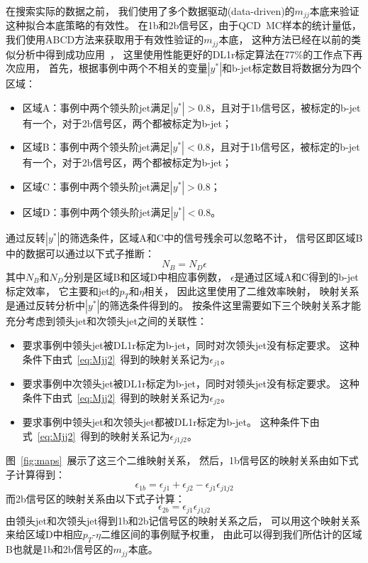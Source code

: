 在搜索实际的数据之前，
我们使用了多个数据驱动(data-driven)的$m_{jj}$本底来验证这种拟合本底策略的有效性。
在1b和2b信号区，由于QCD~MC样本的统计量低，我们使用ABCD方法来获取用于有效性验证的$m_{jj}$本底，
这种方法已经在以前的类似分析中得到成功应用~\cite{ATLASDijet9}，
这里使用性能更好的DL1r标定算法在77\%的工作点下再次应用，
首先，根据事例中两个不相关的变量$|y^*|$和b-jet标定数目将数据分为四个区域：
\begin{itemize}
  \item 区域A：事例中两个领头阶jet满足$|y^*|>0.8$，且对于1b信号区，被标定的b-jet有一个，对于2b信号区，两个都被标定为b-jet；
  \item 区域B：事例中两个领头阶jet满足$|y^*|<0.8$，且对于1b信号区，被标定的b-jet有一个，对于2b信号区，两个都被标定为b-jet；
  \item 区域C：事例中两个领头阶jet满足$|y^*|>0.8$；
  \item 区域D：事例中两个领头阶jet满足$|y^*|<0.8$。
\end{itemize}
通过反转$|y^*|$的筛选条件，区域A和C中的信号残余可以忽略不计，
信号区即区域B中的数据可以通过以下式子推断：
\begin{equation}
\label{eq:Mjj2}
N_B=N_D	\epsilon
\end{equation}
其中$N_B$和$N_D$分别是区域B和区域D中相应事例数，
$\epsilon$是通过区域A和C得到的b-jet标定效率，
它主要和jet的$p_{T}$和$\eta$相关，
因此这里使用了二维效率映射，
映射关系是通过反转分析中$|y^*|$的筛选条件得到的。
按条件这里需要如下三个映射关系才能充分考虑到领头jet和次领头jet之间的关联性：
\begin{itemize}
  \item 要求事例中领头jet被DL1r标定为b-jet，同时对次领头jet没有标定要求。
 这种条件下由式~\ref{eq:Mjj2}~得到的映射关系记为$\epsilon_{j1}$。
   \item 要求事例中次领头jet被DL1r标定为b-jet，同时对领头jet没有标定要求。
 这种条件下由式~\ref{eq:Mjj2}~得到的映射关系记为$\epsilon_{j2}$。
   \item 要求事例中领头jet和次领头jet都被DL1r标定为b-jet。
 这种条件下由式~\ref{eq:Mjj2}~得到的映射关系记为$\epsilon_{j1j2}$。
\end{itemize}
图~\ref{fig:maps}~展示了这三个二维映射关系，
然后，1b信号区的映射关系由如下式子计算得到：
\begin{equation}
\label{eq:Mjj3}
\epsilon_{1b} = \epsilon_{j1} + \epsilon_{j2} - \epsilon_{j1} \epsilon_{j1j2}
\end{equation}
而2b信号区的映射关系由以下式子计算：
\begin{equation}
\label{eq:Mjj4}
\epsilon_{2b} = \epsilon_{j1}  \epsilon_{j1j2}
\end{equation}
由领头jet和次领头jet得到1b和2b记信号区的映射关系之后，
可以用这个映射关系来给区域D中相应$p_{T}$-$\eta$二维区间的事例赋予权重，
由此可以得到我们所估计的区域B也就是1b和2b信号区的$m_{jj}$本底。

